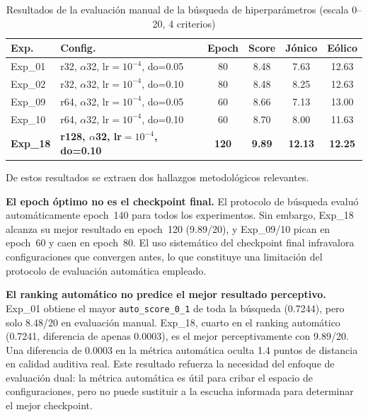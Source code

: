 \documentclass[%
    school=etsisi,%
    type=pfg,%
    degree=61CD,%
]{upm-report}
\begin{document}
\begin{table}[H]
    \centering
    \caption{Resultados de la evaluaci\'on manual de la b\'usqueda de hiperpar\'ametros (escala 0--20, 4 criterios)}
    \label{tab:stage1-manual}
    \small
    \begin{tabular}{lp{4.5cm}cccc}
        \toprule
        \textbf{Exp.} & \textbf{Config.} & \textbf{Epoch} & \textbf{Score} & \textbf{J\'onico} & \textbf{E\'olico} \\
        \midrule
        Exp\_01 & r32, $\alpha$32, lr$=10^{-4}$, do=0.05 & 80  & 8.48 & 7.63  & 12.63 \\
        Exp\_02 & r32, $\alpha$32, lr$=10^{-4}$, do=0.10 & 80  & 8.48 & 8.25  & 12.63 \\
        Exp\_09 & r64, $\alpha$32, lr$=10^{-4}$, do=0.05 & 60  & 8.66 & 7.13  & 13.00 \\
        Exp\_10 & r64, $\alpha$32, lr$=10^{-4}$, do=0.10 & 60  & 8.70 & 8.00  & 11.63 \\
        \textbf{Exp\_18} & \textbf{r128, $\alpha$32, lr$=10^{-4}$, do=0.10} & \textbf{120} & \textbf{9.89} & \textbf{12.13} & \textbf{12.25} \\
        \bottomrule
    \end{tabular}
\end{table}

De estos resultados se extraen dos hallazgos metodol\'ogicos relevantes.

\textbf{El epoch \'optimo no es el checkpoint final.} El protocolo de b\'usqueda evalu\'o autom\'aticamente epoch~140 para todos los experimentos. Sin embargo, Exp\_18 alcanza su mejor resultado en epoch~120 (9.89/20), y Exp\_09/10 pican en epoch~60 y caen en epoch~80. El uso sistem\'atico del checkpoint final infravalora configuraciones que convergen antes, lo que constituye una limitaci\'on del protocolo de evaluaci\'on autom\'atica empleado.

\textbf{El ranking autom\'atico no predice el mejor resultado perceptivo.} Exp\_01 obtiene el mayor \texttt{auto\_score\_0\_1} de toda la b\'usqueda (0.7244), pero solo 8.48/20 en evaluaci\'on manual. Exp\_18, cuarto en el ranking autom\'atico (0.7241, diferencia de apenas 0.0003), es el mejor perceptivamente con 9.89/20. Una diferencia de 0.0003 en la m\'etrica autom\'atica oculta 1.4 puntos de distancia en calidad auditiva real. Este resultado refuerza la necesidad del enfoque de evaluaci\'on dual: la m\'etrica autom\'atica es \'util para cribar el espacio de configuraciones, pero no puede sustituir a la escucha informada para determinar el mejor checkpoint.
\end{document}
